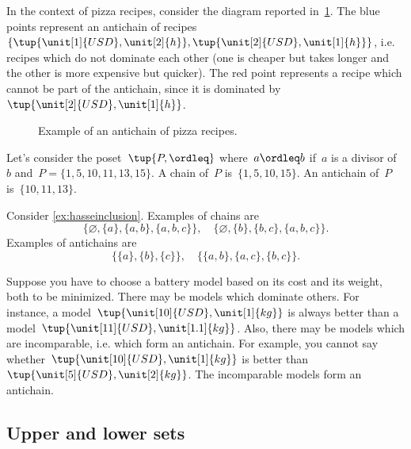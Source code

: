 In the context of pizza recipes, consider the diagram reported in~\cref{fig:antichain}. The blue points represent an antichain of recipes~$\{\tup{\unit[1]{USD},\unit[2]{h}},\tup{\unit[2]{USD},\unit[1]{h}}\}$, i.e. recipes which do not dominate each other (one is cheaper but takes longer and the other is more expensive but quicker). The red point represents a recipe which cannot be part of the antichain, since it is dominated by~$\tup{\unit[2]{USD},\unit[1]{h}}$. 

\begin{figure}[h!]
\begin{center}
\end{center}
\caption{Example of an antichain of pizza recipes. \label{fig:antichain}}
\end{figure}


\begin{example}
Let's consider the poset~$\tup{P,\ordleq}$ where~$a\ordleq b$ if~$a$ is a divisor of~$b$ and~$P=\{1,5,10,11,13,15\}$. A chain of~$P$ is~$\{1,5,10,15\}$. An antichain of~$P$ is~$\{10,11,13\}$.
\end{example}

\begin{example}
Consider \cref{ex:hasseinclusion}. Examples of chains are 
\begin{equation}
    \{\varnothing,\{a\},\{a,b\},\{a,b,c\}\}, \quad  \{\varnothing,\{b\},\{b,c\},\{a,b,c\}\}.
\end{equation}
Examples of antichains are
\begin{equation}
    \{\{a\},\{b\},\{c\}\}, \quad \{ \{a,b\},\{a,c\}, \{b,c\}\}.
\end{equation}
\end{example}

\begin{example}
\label{ex:battery}
Suppose you have to choose a battery model based on its cost and its weight, both to be minimized. There may be models which dominate others. For instance, a model~$\tup{\unit[10]{USD},\unit[1]{kg}}$ is always better than a model~$\tup{\unit[11]{USD},\unit[1.1]{kg}}$. Also, there may be models which are incomparable, i.e. which form an antichain. For example, you cannot say whether~$\tup{\unit[10]{USD},\unit[1]{kg}}$ is better than~$\tup{\unit[5]{USD},\unit[2]{kg}}$. The incomparable models form an antichain.
\end{example}

\subsection{Upper and lower sets}

